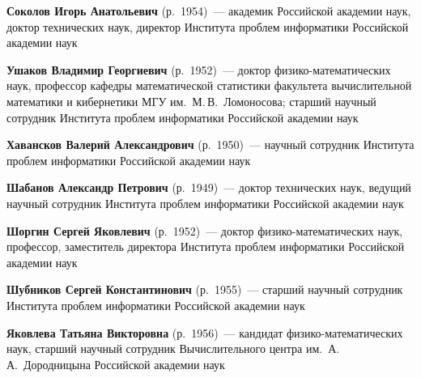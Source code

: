 \begin{multicols}{2}
\noindent
\textbf{Соколов Игорь Анатольевич} (р.\ 1954)~---
академик Российской академии наук, доктор технических наук, директор Института проблем информатики Российской академии наук

\noindent
\textbf{Ушаков Владимир Георгиевич} (р.\ 1952)~---
  доктор физи\-ко-ма\-те\-ма\-ти\-че\-ских наук, профессор кафедры математической статистики факультета вычислительной математики и кибернетики МГУ им.\ М.\,В.~Ломоносова; старший научный сотрудник Института проблем информатики Российской академии наук

  \noindent
\textbf{Хавансков Валерий Александрович} (р.\ 1950)~---
научный сотрудник Института проблем информатики Российской академии наук

\noindent
\textbf{Шабанов Александр Петрович} (р.\ 1949)~---
доктор технических наук, ведущий научный сотрудник Института проблем информатики Российской академии наук


\noindent
\textbf{Шоргин Сергей Яковлевич} (р.\ 1952)~--- доктор
фи\-зи\-ко-ма\-те\-ма\-ти\-че\-ских наук, профессор, заместитель директора Института
проб\-лем информатики Российской академии наук


\noindent
\textbf{Шубников Сергей Константинович} (р.\ 1955)~---
старший научный сотрудник Института проблем информатики Российской академии наук

\noindent
\textbf{Яковлева Татьяна Викторовна} (р.\ 1956)~---
 кандидат фи\-зи\-ко-ма\-те\-ма\-ти\-че\-ских наук, старший научный сотрудник Вычислительного центра им.\ А.\,А.~Дородницына Российской академии наук






 \label{end\stat}










\end{multicols}

\newpage